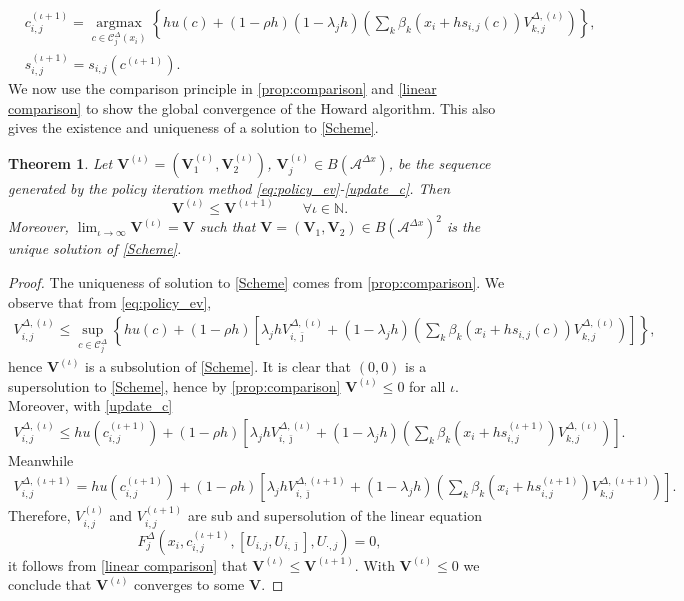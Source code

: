 \documentclass[11pt]{article}
\numberwithin{equation}{section}
\newtheorem{theorem}{Theorem}[section]
\theoremstyle{Claim}
\newcommand{\N}{\mathbb{N}}
\newcommand{\mA}{\mathcal A}
\newcommand{\mC}{\mathcal C}
\def\i{{(\iota)}}
\def\bV{{\mathbf{V}}}
\theoremstyle{plain}
\newcommand{\D}{\Delta}
\newcommand{\Dx}{{\Delta x}}
\begin{document}
\begin{equation}\label{update_c}
\begin{aligned}
        &c^{(\iota+1)}_{i,j}=\mathop{\arg\max}\limits_{c\in \mC^{\D}_{j}(x_i)}\left\{
		hu(c)+(1-\rho h)(1-\lambda_jh)\left(\sum_k \beta_k(x_i+hs_{i,j}(c))V^{\D,\i}_{k,j}\right)\right\},\\
&s^{(\iota+1)}_{i,j}=s_{i,j}(c^{(\iota+1)}).		
\end{aligned}
\end{equation}
We now use the comparison principle in \cref{prop:comparison} and \cref{linear comparison} to show the global convergence of the Howard algorithm. This also gives the existence and uniqueness of a solution to \cref{Scheme}.
\begin{theorem}\label{Howard theo}
	Let $\bV^\i=(\bV^\i_1, \bV^\i_2)$, $\bV^\i_j\in  B(\mA^\Dx)$, be the sequence generated by the policy iteration method \eqref{eq:policy_ev}-\eqref{update_c}. Then
	\begin{equation}\label{eq:est_PI}
		\bV^\i \le \bV^{(\iota+1)} \qquad \forall \iota \in \N.
	\end{equation}
Moreover, $\lim_{\iota \to \infty}\bV^\i=\bV$ such that $\bV=(\bV_1,\bV_2)\in B(\mA^\Dx)^2$ is the unique solution of \cref{Scheme}.
\end{theorem}
\begin{proof}
The uniqueness of solution to \cref{Scheme} comes from \cref{prop:comparison}. We observe that from \cref{eq:policy_ev},
\begin{align*}
     V_{i,j}^{\Delta, \i} 
     \leq  \sup_{c\in \mC^{\D}_{j}}\left\{hu(c)+(1-\rho h)\left[\lambda_jhV_{i,\bar{\jmath}}^{\Delta,\i}+(1-\lambda_jh)\left(\sum_k\beta_k(x_i+hs_{i,j}(c))V_{k,j}^{\Delta,\i}\right)\right]\right\},
\end{align*}
hence $\bV^\i$ is a subsolution of \cref{Scheme}. It is clear that $(0,0)$ is a supersolution to \cref{Scheme}, hence  by \cref{prop:comparison} $\bV^\i\leq 0$ for all $\iota$.
	Moreover, with \cref{update_c}
	\begin{align*}
		V_{i,j}^{\Delta, \i} 
	\leq 	hu(c_{i,j}^{(\iota+1)})+(1-\rho h)\left[\lambda_jhV_{i,\bar{\jmath}}^{\Delta,\i}+(1-\lambda_jh)\left(\sum_k\beta_k\left(x_i+hs_{i,j}^{(\iota+1)}\right)V_{k,j}^{\Delta,\i}\right)\right].
	\end{align*}
Meanwhile
\begin{align*}
		V_{i,j}^{\Delta, (\iota+1)}=hu(c_{i,j}^{(\iota+1)})
		+(1-\rho h)\left[\lambda_jhV_{i,\bar{\jmath}}^{\Delta,(\iota+1)}+(1-\lambda_jh)\left(\sum_k\beta_k\left(x_i+hs_{i,j}^{(\iota+1)}\right)V_{k,j}^{\Delta,(\iota+1)}\right)\right].
	\end{align*}
	Therefore, $V^\i_{i,j}$ and  $V^{(\iota+1)}_{i,j}$ are sub and supersolution of the linear equation 
	$$
	F_j^\D(x_i,c_{i,j}^{(\iota+1)},[U_{i,j},U_{i,\bar{\jmath}}],U_{\cdot,j})=0,
	$$
it follows from \cref{linear comparison} that $\bV^\i \le \bV^{(\iota+1)}$. With $\bV^\i \le  0$ we conclude that $\bV^\i $ converges to some $\bV$. 
\end{proof}
	
\end{document}
